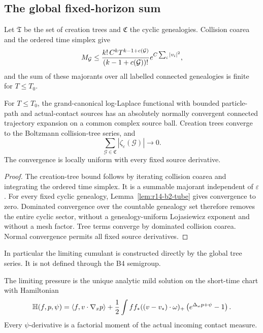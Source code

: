 \subsection{The global fixed-horizon sum}

Let \(\mathfrak T\) be the set of creation trees and
\(\mathfrak C\) the cyclic genealogies.  Collision coarea and the ordered
time simplex give
\[
 M_{\mathcal G}
 \le {k!\,C^kT^{k-1+c(\mathcal G)}
        \over (k-1+c(\mathcal G))!}
 e^{C\sum_i|v_i|^2},
\]
and the sum of these majorants over all labelled connected genealogies is
finite for \(T\le T_0\).

\begin{theorem}
\label{thm:r14-b2-cluster}
For \(T\le T_0\), the grand-canonical log-Laplace functional with bounded
particle-path and actual-contact sources has an absolutely normally
convergent connected trajectory expansion on a common complex source ball.
Creation trees converge to the Boltzmann collision-tree series, and
\[
 \sum_{\mathcal G\in\mathfrak C}
 |\zeta_\varepsilon(\mathcal G)|\longrightarrow0 .
\]
The convergence is locally uniform with every fixed source derivative.
\end{theorem}

\begin{proof}
The creation-tree bound follows by iterating collision coarea and integrating
the ordered time simplex.  It is a summable majorant independent of
\(\varepsilon\).  For every fixed cyclic genealogy,
Lemma~\ref{lem:r14-b2-tube} gives convergence to zero.  Dominated convergence
over the countable genealogy set therefore removes the entire cyclic sector,
without a genealogy-uniform Lojasiewicz exponent and without a mesh factor.
Tree terms converge by dominated collision coarea.  Normal convergence
permits all fixed source derivatives.
\end{proof}

In particular the limiting cumulant is constructed directly by the global
tree series.  It is not defined through the B4 semigroup.

\begin{theorem}
\label{thm:r14-b2-hamiltonian}
The limiting pressure is the unique analytic mild solution on the short-time
chart with Hamiltonian
\[
 \mathbb H(f,p,\psi)
 =
 \langle f,v\cdot\nabla_xp\rangle
 +{1\over2}\int ff_*((v-v_*)\cdot\omega)_+
 \left(e^{\Delta_\omega p+\psi}-1\right).
\]
Every \(\psi\)-derivative is a factorial moment of the actual incoming contact
measure.
\end{theorem}

